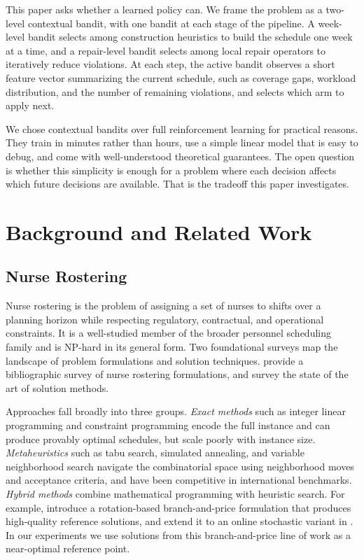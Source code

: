 \documentclass{article}
\begin{document}
This paper asks whether a learned policy can. We frame the problem as a
two-level contextual bandit, with one bandit at each stage of the
pipeline. A week-level bandit selects among construction heuristics to
build the schedule one week at a time, and a repair-level bandit selects
among local repair operators to iteratively reduce violations. At each
step, the active bandit observes a short feature vector summarizing the
current schedule, such as coverage gaps, workload distribution, and the
number of remaining violations, and selects which arm to apply next.

We chose contextual bandits over full reinforcement learning for practical
reasons. They train in minutes rather than hours, use a simple linear
model that is easy to debug, and come with well-understood theoretical
guarantees. The open question is whether this simplicity is enough for a
problem where each decision affects which future decisions are available.
That is the tradeoff this paper investigates.

\section{Background and Related Work}

\subsection{Nurse Rostering}

Nurse rostering is the problem of assigning a set of nurses to shifts over
a planning horizon while respecting regulatory, contractual, and operational
constraints. It is a well-studied member of the broader personnel
scheduling family and is NP-hard in its general form. Two foundational
surveys map the landscape of problem formulations and solution techniques.
\citet{cheang2003bibliographic} provide a bibliographic survey of nurse
rostering formulations, and \citet{burke2004state} survey the state of the
art of solution methods.

Approaches fall broadly into three groups. \emph{Exact methods} such as
integer linear programming and constraint programming encode the full
instance and can produce provably optimal schedules, but scale poorly with
instance size. \emph{Metaheuristics} such as tabu search, simulated
annealing, and variable neighborhood search navigate the combinatorial
space using neighborhood moves and acceptance criteria, and have been
competitive in international benchmarks. \emph{Hybrid methods} combine
mathematical programming with heuristic search. For example,
\citet{legrain2020rotation} introduce a rotation-based branch-and-price
formulation that produces high-quality reference solutions, and extend it
to an online stochastic variant in \citet{legrain2019online}. In our
experiments we use solutions from this branch-and-price line of work as a
near-optimal reference point.
\end{document}

